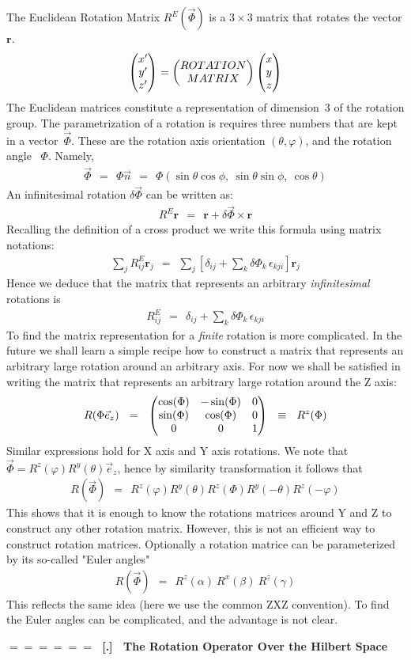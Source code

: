 \documentclass[onecolumn,fleqn]{revtex4}
\newcommand{\amatrix}[1]{\begin{matrix} #1 \end{matrix}}
\newcommand{\beq}{\begin{eqnarray}}
\newcommand{\eeq}{\end{eqnarray}}
\renewcommand{\thesubsection}{\arabic{subsection}}
\renewcommand{\thesubsubsection}{\arabic{subsubsection}}
\newcommand{\sheadC}[1]
{
\addtocounter{subsubsection}{1}
\vspace{5mm}
{\Large\bf $=\!=\!=\!=\!=\!=\;$ [\thesubsection.\thesubsubsection] \ #1}  
\nopagebreak
\phantomsection
}
\begin{document}
The Euclidean Rotation Matrix ${R^E(\vec{\Phi})}$ 
is a ${3\times3}$ matrix that rotates the vector ${\mathbf{r}}$.
\beq
\left( \amatrix{x' \cr y' \cr z'} \right) 
= \left( \amatrix{ROTATION \cr MATRIX} \right) \left( \amatrix{x \cr y \cr z} \right) 
\eeq
The Euclidean matrices constitute  
a representation of dimension~$3$
of the rotation group.
The parametrization of a rotation 
is requires three numbers that are kept in a vector~${\vec{\Phi}}$. 
These are the rotation axis orientation $(\theta, \varphi)$, 
and the rotation angle~ ${ \Phi }$. Namely, 
\beq
\vec{\Phi} \ \ =  \ \ \Phi\vec{n} \ \ = \ \ \Phi(\sin\theta\cos\phi,\ \sin\theta\sin\phi,\ \cos\theta) 
\eeq
An infinitesimal rotation $\delta \vec{\Phi}$ can be written as:
\beq
R^E \mathbf{r} \ \ = \ \ \mathbf{r}+ \delta \vec{\Phi} \times \mathbf{r} 
\eeq
Recalling the definition of a cross product we write 
this formula using matrix notations:
\beq
\sum_j R^E_{ij} \mathbf{r}_j \ \ = \ \ 
\sum_j \left[ 
\delta_{ij} + \sum_k \delta\Phi_k \, \epsilon_{kji}
\right] \mathbf{r}_j 
\eeq
Hence we deduce that the matrix that represents 
an arbitrary {\em infinitesimal} rotations is   
\beq
R^E_{ij} \ \ = \ \ \delta_{ij} + \sum_k \delta\Phi_k \, \epsilon_{kji}
\eeq
To find the matrix representation for a {\em finite} rotation 
is more complicated. In the future we shall learn a simple 
recipe how to construct a matrix that represents 
an arbitrary large rotation around an arbitrary axis. 
For now we shall be satisfied in writing the matrix that represents 
an arbitrary large rotation around the Z axis:
\beq
R(\Phi\vec{e}_z)
\ \ = \ \ \left(\amatrix{ 
\cos(\Phi) & -\sin(\Phi) & 0 \cr 
\sin(\Phi) & \cos(\Phi) & 0 \cr 
0 & 0 & 1 }  
\right) 
\ \ \equiv \ \ R^z(\Phi) 
\eeq
Similar expressions hold for X axis and Y axis rotations.
We note that $\vec{\Phi}=R^z(\varphi) R^y(\theta)\vec{e}_z$, 
hence by similarity transformation it follows that    
\beq
R(\vec{\Phi}) \ \ = \ \ R^z(\varphi) R^y(\theta) R^z(\Phi) R^y(-\theta) R^z(-\varphi)
\eeq
This shows that it is enough to know the rotations matrices 
around Y and Z to construct any other rotation matrix.  
However, this is not an efficient way to construct rotation matrices. 
Optionally a rotation matrice can be parameterized by its 
so-called "Euler angles" 
\beq
R(\vec{\Phi}) \ \ = \ \ R^z(\alpha) \ R^x(\beta) \ R^z(\gamma)
\eeq
This reflects the same idea (here we use the common ZXZ convention). 
To find the Euler angles can be complicated, and the advantage is not clear.


\sheadC{The Rotation Operator Over the Hilbert Space}
\end{document}

